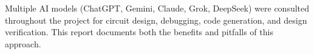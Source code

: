\begin{calloutdecision}
Multiple AI models (ChatGPT, Gemini, Claude, Grok, DeepSeek) were consulted
throughout the project for circuit design, debugging, code generation, and
design verification.  This report documents both the benefits and pitfalls of this
approach.
\end{calloutdecision}
